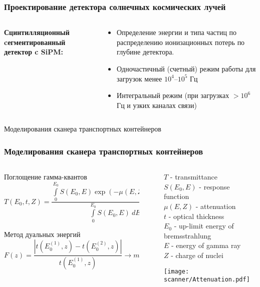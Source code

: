 \begin{frame}
\frametitle{Проектирование детектора солнечных космических лучей}
\begin{columns}
	\begin{column}{0.4\textwidth}
		\textbf{Сцинтилляционный cегментированный детектор c SiPM:}
	\end{column}
	\begin{column}{0.6\textwidth}
		\begin{itemize}
			\item Определение энергии и типа частиц по распределению ионизационных потерь по глубине детектора.
			\item Одночастичный (счетный) режим работы для загрузок менее $10^4 – 10^5$ Гц
			\item Интегральный режим (при загрузках $>10^6$ Гц и узких каналах связи)
		\end{itemize}
	\end{column}
\end{columns} 
\end{frame}



\begin{frame}
\begin{center}
	\Huge
	Моделирования сканера транспортных контейнеров
\end{center}
\end{frame}

\begin{frame}
\frametitle{Моделирования сканера транспортных контейнеров}
\begin{columns}
	\begin{column}{0.7\textwidth}
		\begin{block}{Поглощение гамма-квантов}
		$$
		T(E_0, t, Z) = \frac{\int \limits_0^{E_0} S(E_0, E) \exp(-\mu(E,Z)\times t)~dE)}{\int \limits_0^{E_0} S(E_0, E)~dE}
		$$
	\end{block}
    \begin{block}{Метод дуальных энергий}
    	$$
    	F(z) = \frac{|t(E^{(1)}_0,z) - t(E^{(2)}_0,z)|}{t(E^{(1)}_0,z)} \to min
    	$$
\end{block}
	\end{column}
	\vline~
	\begin{column}{0.4\textwidth} 
		$T$ -  transmittance\\
		$S(E_0, E)$ - response function\\
		$\mu(E,Z)$ - attenuation\\
		$t$ -  optical thickness\\
		$E_0$ -  up-limit energy of bremsstrahlung\\
		$E$ - energy of gamma ray\\
		$Z$ - charge of nuclei 
        
        \texttt{[image: scanner/Attenuation.pdf]}
	\end{column}
\end{columns}  
\end{frame}

